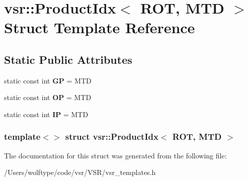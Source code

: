 \hypertarget{structvsr_1_1_product_idx_3_01_r_o_t_00_01_m_t_d_01_4}{\section{vsr\-:\-:Product\-Idx$<$ R\-O\-T, M\-T\-D $>$ Struct Template Reference}
\label{structvsr_1_1_product_idx_3_01_r_o_t_00_01_m_t_d_01_4}
}
\subsection*{Static Public Attributes}
\begin{DoxyCompactItemize}
\item 
\hypertarget{structvsr_1_1_product_idx_3_01_r_o_t_00_01_m_t_d_01_4_ac3a8c07955e74da7f883879f23355e06}{static const int {\bfseries G\-P} = M\-T\-D}\label{structvsr_1_1_product_idx_3_01_r_o_t_00_01_m_t_d_01_4_ac3a8c07955e74da7f883879f23355e06}

\item 
\hypertarget{structvsr_1_1_product_idx_3_01_r_o_t_00_01_m_t_d_01_4_a51a085cb8466af1595e11204da1f26d0}{static const int {\bfseries O\-P} = M\-T\-D}\label{structvsr_1_1_product_idx_3_01_r_o_t_00_01_m_t_d_01_4_a51a085cb8466af1595e11204da1f26d0}

\item 
\hypertarget{structvsr_1_1_product_idx_3_01_r_o_t_00_01_m_t_d_01_4_a924f7eae7cd9681c106adfa7d3dd4000}{static const int {\bfseries I\-P} = M\-T\-D}\label{structvsr_1_1_product_idx_3_01_r_o_t_00_01_m_t_d_01_4_a924f7eae7cd9681c106adfa7d3dd4000}

\end{DoxyCompactItemize}
\subsubsection*{template$<$$>$ struct vsr\-::\-Product\-Idx$<$ R\-O\-T, M\-T\-D $>$}



The documentation for this struct was generated from the following file\-:\begin{DoxyCompactItemize}
\item 
/\-Users/wolftype/code/vsr/\-V\-S\-R/vsr\-\_\-templates.\-h\end{DoxyCompactItemize}
